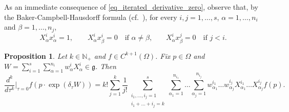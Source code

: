 \documentclass[11pt]{amsart}
\theoremstyle{plain}
\newtheorem{proposition}[theorem]{Proposition}
\theoremstyle{definition}
\theoremstyle{remark}
\numberwithin{equation}{section}
\begin{document}
As an immediate consequence of \eqref{eq_iterated_derivative_zero}, observe that, by the Baker-Campbell-Hausdorff formula (cf.~\cite{MR746308}), for every $i,j=1,\dots,s$, $\alpha=1,\dots,n_i$ and $\beta=1,\dots,n_j$,
\begin{equation} \label{eq_derivatives_coordinates}
X^i_\alpha x^i_\alpha = 1, \qquad X^i_\alpha x^i_\beta = 0 \quad \text{if $\alpha \neq \beta$,} \qquad X^i_\alpha x^j_\beta = 0 \quad \text{if $j<i$.}
\end{equation}
\begin{proposition}
Let $k \in \mathbb{N}_+$ and $f \in C^{k+1}(\Omega)$. Fix $p \in \Omega$ and $W=\displaystyle \sum_{i=1}^s \sum_{\alpha=1}^{n_i} w^i_\alpha X^i_\alpha \in \mathfrak{g}$. Then
\begin{equation} \label{eq_Taylor_coefficients}
\frac{d^k}{d\tau^k}\bigg\rvert_{\tau=0} f(p \cdot \exp(\delta_\tau W)) = k! \sum_{j=1}^k \frac{1}{j!} \sum_{\substack{i_1,\dots,i_j=1 \\ i_1+\dots+i_j=k}}^s \sum_{\alpha_1=1}^{n_{i_1}} \dots \sum_{\alpha_j=1}^{n_{i_j}} w^{i_1}_{\alpha_1} \dots w^{i_j}_{\alpha_j} X^{i_1}_{\alpha_1} \dots X^{i_j}_{\alpha_j}f(p).
\end{equation}
\end{proposition}
\end{document}
